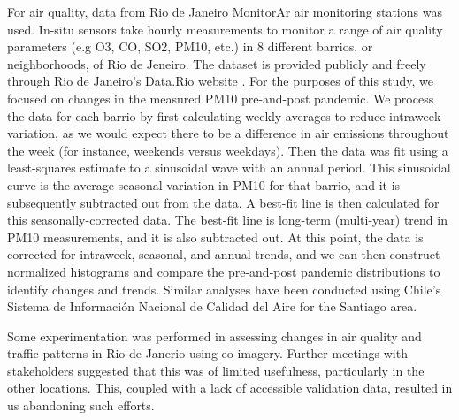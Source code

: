 For air quality, data from Rio de Janeiro MonitorAr air monitoring stations was used. In-situ sensors take hourly measurements to monitor a range of air quality parameters (e.g O3, CO, SO2, PM10, etc.) in 8 different barrios, or neighborhoods, of Rio de Jeneiro. The dataset is provided publicly and freely through Rio de Janeiro's Data.Rio website \cite{institutopereirapassosDataRio2017}. For the purposes of this study, we focused on changes in the measured PM10 pre-and-post pandemic. We process the data for each barrio by first calculating weekly averages to reduce intraweek variation, as we would expect there to be a difference in air emissions throughout the week (for instance, weekends versus weekdays). Then the data was fit using a least-squares estimate to a sinusoidal wave with an annual period. This sinusoidal curve is the average seasonal variation in PM10 for that barrio, and it is subsequently subtracted out from the data. A best-fit line is then calculated for this seasonally-corrected data. The best-fit line is long-term (multi-year) trend in PM10 measurements, and it is also subtracted out. At this point, the data is corrected for intraweek, seasonal, and annual trends, and we can then construct normalized histograms and compare the pre-and-post pandemic distributions to identify changes and trends. Similar analyses have been conducted using Chile's Sistema de Información Nacional de Calidad del Aire \cite{ministeriodecienciatecnologiaconocimientoeinnovacionDatosCOVID192021} for the Santiago area.

Some experimentation was performed in assessing changes in air quality and traffic patterns in Rio de Janerio using \ac{eo} imagery. Further meetings with stakeholders suggested that this was of limited usefulness, particularly in the other locations. This, coupled with a lack of accessible validation data, resulted in us abandoning such efforts.

\subsubsection{}

